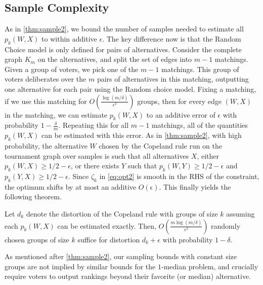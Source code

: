 \subsection{Sample Complexity}
As in \cref{thm:sample2}, we bound the number of samples needed to estimate all $p_k(W,X)$ to within additive $\epsilon$.  The key difference now is that the Random Choice model is only defined for pairs of alternatives. Consider the complete graph $K_m$ on the alternatives, and split the set of edges into $m-1$ matchings. Given a group of voters, we pick one of the $m-1$ matchings. This group of voters deliberates over the $m$ pairs of alternatives in this matching, outputting one alternative for each pair using the Random choice model. Fixing a matching, if we use this matching for $O\left(\frac{\log (m/\delta)}{\epsilon^2}  \right)$ groups, then for every edge $(W,X)$ in the matching, we can estimate $p_k(W,X)$ to an additive error of $\epsilon$ with probability $1-\frac{\delta}{m}$. Repeating this for all $m-1$ matchings, all of the  quantities $p_k(W,X)$ can be estimated with this error. As in \cref{thm:sample2}, with high probability, the alternative $W$ chosen by the Copeland rule run on the tournament graph over samples is such that all alternatives $X$, either $p_k(W,X) \ge 1/2 - \epsilon$, or there exists $Y$ such that $p_k(W,Y) \ge 1/2 - \epsilon$ and $p_k(Y,X) \ge 1/2 - \epsilon$. Since $\zeta_k$ in \cref{eq:opt2} is smooth in the RHS of the constraint, the optimum shifts by at most an additive $O(\epsilon)$. This finally yields the following theorem.

\begin{theorem}
\label{thm:sample1}
Let $d_k$ denote the distortion of the Copeland rule with groups of size $k$ assuming each $p_k(W,X)$ can be estimated exactly. Then, $O\left(\frac{m \log (m/\delta)}{\epsilon^2}\right)$ randomly chosen groups of size $k$ suffice for distortion $d_k + \epsilon$ with probability $1-\delta$.
\end{theorem}

As mentioned after \cref{thm:sample2}, our sampling bounds with constant size groups are not implied by similar bounds for the $1$-median problem, and crucially require voters to output rankings beyond their favorite (or median) alternative.